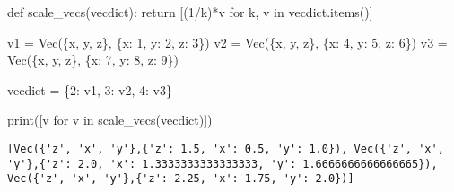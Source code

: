 \documentclass[
  letterpaper,
  DIV=11,
  numbers=noendperiod]{scrartcl}
\newenvironment{Shaded}{\begin{snugshade}}{\end{snugshade}}
\newcommand{\BuiltInTok}[1]{\textcolor[rgb]{0.00,0.23,0.31}{#1}}
\newcommand{\ControlFlowTok}[1]{\textcolor[rgb]{0.00,0.23,0.31}{#1}}
\newcommand{\DecValTok}[1]{\textcolor[rgb]{0.68,0.00,0.00}{#1}}
\newcommand{\KeywordTok}[1]{\textcolor[rgb]{0.00,0.23,0.31}{#1}}
\newcommand{\NormalTok}[1]{\textcolor[rgb]{0.00,0.23,0.31}{#1}}
\newcommand{\OperatorTok}[1]{\textcolor[rgb]{0.37,0.37,0.37}{#1}}
\newcommand{\StringTok}[1]{\textcolor[rgb]{0.13,0.47,0.30}{#1}}
\begin{document}
\begin{Shaded}
\begin{Highlighting}[numbers=left,,]
\KeywordTok{def}\NormalTok{ scale\_vecs(vecdict):}
    \ControlFlowTok{return}\NormalTok{ [(}\DecValTok{1}\OperatorTok{/}\NormalTok{k)}\OperatorTok{*}\NormalTok{v }\ControlFlowTok{for}\NormalTok{ k, v }\KeywordTok{in}\NormalTok{ vecdict.items()]}

\NormalTok{v1 }\OperatorTok{=}\NormalTok{ Vec(\{}\StringTok{\textquotesingle{}x\textquotesingle{}}\NormalTok{, }\StringTok{\textquotesingle{}y\textquotesingle{}}\NormalTok{, }\StringTok{\textquotesingle{}z\textquotesingle{}}\NormalTok{\}, \{}\StringTok{\textquotesingle{}x\textquotesingle{}}\NormalTok{: }\DecValTok{1}\NormalTok{, }\StringTok{\textquotesingle{}y\textquotesingle{}}\NormalTok{: }\DecValTok{2}\NormalTok{, }\StringTok{\textquotesingle{}z\textquotesingle{}}\NormalTok{: }\DecValTok{3}\NormalTok{\})}
\NormalTok{v2 }\OperatorTok{=}\NormalTok{ Vec(\{}\StringTok{\textquotesingle{}x\textquotesingle{}}\NormalTok{, }\StringTok{\textquotesingle{}y\textquotesingle{}}\NormalTok{, }\StringTok{\textquotesingle{}z\textquotesingle{}}\NormalTok{\}, \{}\StringTok{\textquotesingle{}x\textquotesingle{}}\NormalTok{: }\DecValTok{4}\NormalTok{, }\StringTok{\textquotesingle{}y\textquotesingle{}}\NormalTok{: }\DecValTok{5}\NormalTok{, }\StringTok{\textquotesingle{}z\textquotesingle{}}\NormalTok{: }\DecValTok{6}\NormalTok{\})}
\NormalTok{v3 }\OperatorTok{=}\NormalTok{ Vec(\{}\StringTok{\textquotesingle{}x\textquotesingle{}}\NormalTok{, }\StringTok{\textquotesingle{}y\textquotesingle{}}\NormalTok{, }\StringTok{\textquotesingle{}z\textquotesingle{}}\NormalTok{\}, \{}\StringTok{\textquotesingle{}x\textquotesingle{}}\NormalTok{: }\DecValTok{7}\NormalTok{, }\StringTok{\textquotesingle{}y\textquotesingle{}}\NormalTok{: }\DecValTok{8}\NormalTok{, }\StringTok{\textquotesingle{}z\textquotesingle{}}\NormalTok{: }\DecValTok{9}\NormalTok{\})}

\NormalTok{vecdict }\OperatorTok{=}\NormalTok{ \{}\DecValTok{2}\NormalTok{: v1, }\DecValTok{3}\NormalTok{: v2, }\DecValTok{4}\NormalTok{: v3\}}

\BuiltInTok{print}\NormalTok{([v }\ControlFlowTok{for}\NormalTok{ v }\KeywordTok{in}\NormalTok{ scale\_vecs(vecdict)]) }
\end{Highlighting}
\end{Shaded}

\begin{lstlisting}
[Vec({'z', 'x', 'y'},{'z': 1.5, 'x': 0.5, 'y': 1.0}), Vec({'z', 'x', 'y'},{'z': 2.0, 'x': 1.3333333333333333, 'y': 1.6666666666666665}), Vec({'z', 'x', 'y'},{'z': 2.25, 'x': 1.75, 'y': 2.0})]
\end{lstlisting}
\end{document}
